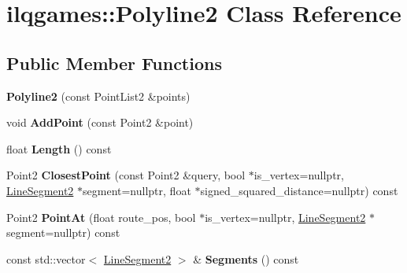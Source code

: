 \hypertarget{classilqgames_1_1_polyline2}{}\section{ilqgames\+:\+:Polyline2 Class Reference}
\label{classilqgames_1_1_polyline2}
\subsection*{Public Member Functions}
\begin{DoxyCompactItemize}
\item 
{\bfseries Polyline2} (const Point\+List2 \&points)\hypertarget{classilqgames_1_1_polyline2_a7ea13438c7c3a9b9501311684d797055}{}\label{classilqgames_1_1_polyline2_a7ea13438c7c3a9b9501311684d797055}

\item 
void {\bfseries Add\+Point} (const Point2 \&point)\hypertarget{classilqgames_1_1_polyline2_af8accf55b36d8aaa7c1ba77f4223b7f4}{}\label{classilqgames_1_1_polyline2_af8accf55b36d8aaa7c1ba77f4223b7f4}

\item 
float {\bfseries Length} () const \hypertarget{classilqgames_1_1_polyline2_ad775da2cbcd5c0c2bcc56109b6b4925e}{}\label{classilqgames_1_1_polyline2_ad775da2cbcd5c0c2bcc56109b6b4925e}

\item 
Point2 {\bfseries Closest\+Point} (const Point2 \&query, bool $\ast$is\+\_\+vertex=nullptr, \hyperlink{classilqgames_1_1_line_segment2}{Line\+Segment2} $\ast$segment=nullptr, float $\ast$signed\+\_\+squared\+\_\+distance=nullptr) const \hypertarget{classilqgames_1_1_polyline2_a4c7e662e2f992ac30d81ee63f1f34e03}{}\label{classilqgames_1_1_polyline2_a4c7e662e2f992ac30d81ee63f1f34e03}

\item 
Point2 {\bfseries Point\+At} (float route\+\_\+pos, bool $\ast$is\+\_\+vertex=nullptr, \hyperlink{classilqgames_1_1_line_segment2}{Line\+Segment2} $\ast$segment=nullptr) const \hypertarget{classilqgames_1_1_polyline2_a74bff45764924f5e6fb7075d5679b212}{}\label{classilqgames_1_1_polyline2_a74bff45764924f5e6fb7075d5679b212}

\item 
const std\+::vector$<$ \hyperlink{classilqgames_1_1_line_segment2}{Line\+Segment2} $>$ \& {\bfseries Segments} () const \hypertarget{classilqgames_1_1_polyline2_a7b840910feca7a921e29b919bb884e42}{}\label{classilqgames_1_1_polyline2_a7b840910feca7a921e29b919bb884e42}

\end{DoxyCompactItemize}



